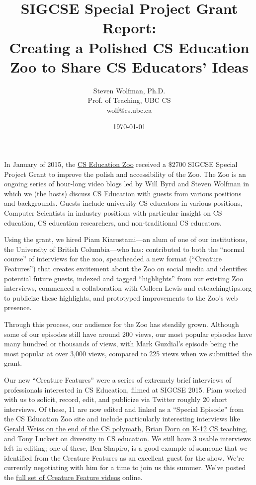\documentclass[11pt]{article}
\title{SIGCSE Special Project Grant Report:\\Creating a Polished CS Education Zoo to Share CS Educators' Ideas}
\author{Steven Wolfman, Ph.D.\\Prof. of Teaching, UBC CS\\wolf@cs.ubc.ca}
\date{\today}
\begin{document}
\maketitle

In January of 2015, the \href{http://webyrd.net/zoo.html}{CS Education Zoo} received a \$2700 SIGCSE
Special Project Grant to improve the polish and accessibility of the
Zoo. The Zoo is an ongoing series of hour-long video blogs led by Will
Byrd and Steven Wolfman in which we (the hosts) discuss CS Education
with guests from various positions and backgrounds.  Guests include
university CS educators in various positions, Computer Scientists in
industry positions with particular insight on CS education, CS
education researchers, and non-traditional CS educators.

Using the grant, we hired Piam Kiarostami---an alum of one of our
institutions, the University of British Columbia---who has:
contributed to both the ``normal course'' of interviews for the zoo,
spearheaded a new format (``Creature Features'') that creates excitement
about the Zoo on social media and identifies potential future guests,
indexed and tagged ``highlights'' from our existing Zoo interviews,
commenced a collaboration with Colleen Lewis and csteachingtips.org to
publicize these highlights, and prototyped improvements to the Zoo's
web presence.

Through this process, our audience for the Zoo has steadily
grown. Although some of our episodes still have around 200 views, our
most popular episodes have many hundred or thousands of views, with
Mark Guzdial's episode being the most popular at over 3,000 views,
compared to 225 views when we submitted the grant.

Our new ``Creature Features'' were a series of extremely brief
interviews of professionals interested in CS Education, filmed at
SIGCSE 2015. Piam worked with us to solicit, record, edit, and
publicize via Twitter roughly 20 short interviews. Of these, 11 are
now edited and linked as a ``Special Episode'' from the CS Education Zoo
site and include particularly interesting interviews like \href{https://youtu.be/NmkwNa493Y4}{Gerald Weiss on the end of the CS polymath}, \href{https://youtu.be/cosUyCwQA8w}{Brian Dorn on K-12 CS teaching}, and
\href{http://youtu.be/NGcT3ClAygo}{Tony Luckett on diversity in CS education}. We still have 3 usable
interviews left in editing; one of these, Ben Shapiro, is a good
example of someone that we identified from the Creature Features as an
excellent guest for the show. We're currently negotiating with him for
a time to join us this summer. We've posted the \href{https://goo.gl/B268dl}{full set of Creature Feature videos} online.
\end{document}
